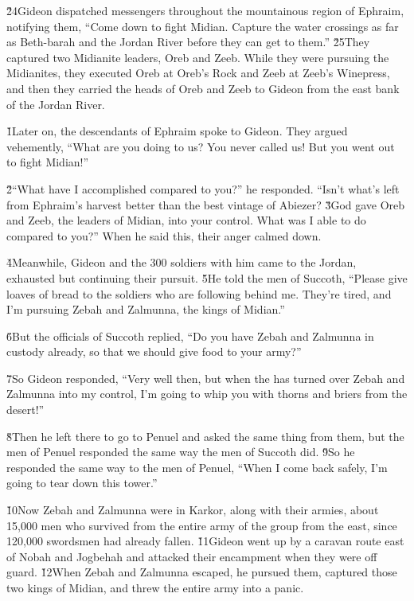 \v{24}Gideon dispatched messengers throughout the mountainous region of Ephraim, notifying them, ``Come down to fight Midian. Capture the water crossings as far as Beth-barah and the Jordan River before they can get to them.'' \v{25}They captured two Midianite leaders, Oreb and Zeeb. While they were pursuing the Midianites, they executed Oreb at Oreb's Rock and Zeeb at Zeeb's Winepress, and then they carried the heads of Oreb and Zeeb to Gideon from the east bank of the Jordan River.

\v{1}Later on, the descendants of Ephraim spoke to Gideon. They argued vehemently, ``What are you doing to us? You never called us! But you went out to fight Midian!''

\v{2}``What have I accomplished compared to you?'' he responded. ``Isn't what's left from Ephraim's harvest better than the best vintage of Abiezer? \v{3}God gave Oreb and Zeeb, the leaders of Midian, into your control. What was I able to do compared to you?'' When he said this, their anger calmed down.

\v{4}Meanwhile, Gideon and the 300 soldiers with him came to the Jordan, exhausted but continuing their pursuit. \v{5}He told the men of Succoth, ``Please give loaves of bread to the soldiers who are following behind me. They're tired, and I'm pursuing Zebah and Zalmunna, the kings of Midian.''

\v{6}But the officials of Succoth replied, ``Do you have Zebah and Zalmunna in custody already, so that we should give food to your army?''

\v{7}So Gideon responded, ``Very well then, but when the  has turned over Zebah and Zalmunna into my control, I'm going to whip you with thorns and briers from the desert!''

\v{8}Then he left there to go to Penuel and asked the same thing from them, but the men of Penuel responded the same way the men of Succoth did. \v{9}So he responded the same way to the men of Penuel, ``When I come back safely, I'm going to tear down this tower.''

\v{10}Now Zebah and Zalmunna were in Karkor, along with their armies, about 15,000 men who survived from the entire army of the group from the east, since 120,000 swordsmen had already fallen. \v{11}Gideon went up by a caravan route east of Nobah and Jogbehah and attacked their encampment when they were off guard. \v{12}When Zebah and Zalmunna escaped, he pursued them, captured those two kings of Midian, and threw the entire army into a panic.

